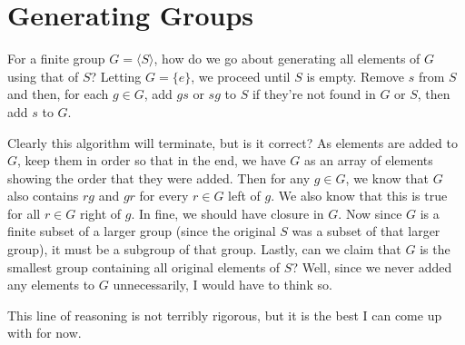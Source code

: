 \documentclass[12pt]{article}
\begin{document}
\section*{Generating Groups}

For a finite group $G=\langle S\rangle$, how do we go about generating all elements of $G$ using that of $S$?
Letting $G=\{e\}$, we proceed until $S$ is empty.  Remove $s$ from $S$ and then, for each $g\in G$,
add $gs$ or $sg$ to $S$ if they're not found in $G$ or $S$, then add $s$ to $G$.

Clearly this algorithm will terminate, but is it correct?  As elements are added to $G$, keep them in order so
that in the end, we have $G$ as an array of elements showing the order that they were added.  Then for any $g\in G$,
we know that $G$ also contains $rg$ and $gr$ for every $r\in G$ left of $g$.  We also know that this is true for
all $r\in G$ right of $g$.  In fine, we should have closure in $G$.  Now since $G$ is a finite subset of a larger group (since
the original $S$ was a subset of that larger group),
it must be a subgroup of that group.  Lastly, can we claim that $G$ is the smallest group containing all original elements of $S$?
Well, since we never added any elements to $G$ unnecessarily, I would have to think so.

This line of reasoning is not terribly rigorous, but it is the best I can come up with for now.

\end{document}
